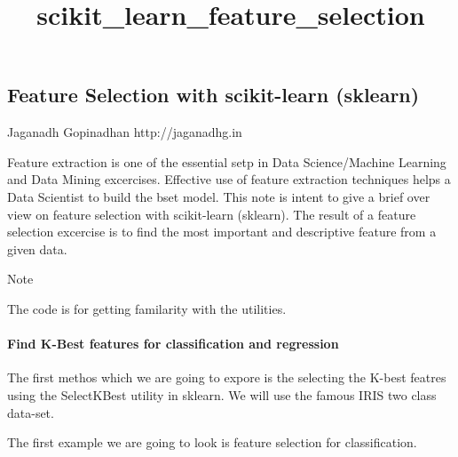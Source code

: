 \documentclass{article}
\title{scikit\_learn\_feature\_selection}
\begin{document}
    
    
    \maketitle
    
    

    
    \subsection{Feature Selection with scikit-learn (sklearn)}

Jaganadh Gopinadhan http://jaganadhg.in

    Feature extraction is one of the essential setp in Data Science/Machine
Learning and Data Mining excercises. Effective use of feature extraction
techniques helps a Data Scientist to build the bset model. This note is
intent to give a brief over view on feature selection with scikit-learn
(sklearn). The result of a feature selection excercise is to find the
most important and descriptive feature from a given data.

Note

The code is for getting familarity with the utilities.

    \paragraph{Find K-Best features for classification and regression}

The first methos which we are going to expore is the selecting the
K-best featres using the SelectKBest utility in sklearn. We will use the
famous IRIS two class data-set.

The first example we are going to look is feature selection for
classification.
\end{document}
